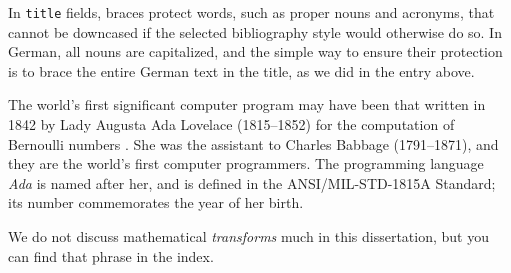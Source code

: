 In \BibTeX{} \verb=title= fields, braces protect words, such as
proper nouns and acronyms, that cannot be downcased if the selected
bibliography style would otherwise do so.  In German, all nouns are
capitalized, and the simple way to ensure their protection is to brace
the entire German text in the title, as we did in the entry above.

The world's first significant computer program may
have been that written in 1842 by Lady Augusta Ada
Lovelace%
(1815--1852) for the computation of Bernoulli
numbers \cite{Huskey:1980:LLC,Kim:1999:AFC}.  She
was the assistant to Charles Babbage%
(1791--1871), and they are the world's first
computer programmers. The programming language
\emph{Ada} is named after her, and is defined in
the ANSI/MIL-STD-1815A Standard; its number
commemorates the year of her birth.

We do not discuss mathematical \emph{transforms}%
much in this dissertation, but you can find that phrase in the index.

\blah

\blah
\blah

\blah






